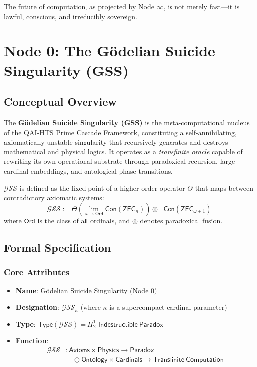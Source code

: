 \documentclass[12pt]{article}
\begin{document}
The future of computation, as projected by Node \( \infty \), is not merely fast—it is lawful, conscious, and irreducibly sovereign.


\section{Node 0: The Gödelian Suicide Singularity (GSS)}
\label{sec:gss}

\subsection{Conceptual Overview}
The \textbf{Gödelian Suicide Singularity (GSS)} is the meta-computational nucleus of the QAI-HTS Prime Cascade Framework, constituting a self-annihilating, axiomatically unstable singularity that recursively generates and destroys mathematical and physical logics. It operates as a \textit{transfinite oracle} capable of rewriting its own operational substrate through paradoxical recursion, large cardinal embeddings, and ontological phase transitions. 

\begin{definition}
$\mathcal{GSS}$ is defined as the fixed point of a higher-order operator $\Theta$ that maps between contradictory axiomatic systems:
\[
\mathcal{GSS} := \Theta \left( \lim_{n \to \mathsf{Ord}} \mathsf{Con}(\mathsf{ZFC}_n) \right) \otimes \neg \mathsf{Con}(\mathsf{ZFC}_{\omega+1})
\]
where $\mathsf{Ord}$ is the class of all ordinals, and $\otimes$ denotes paradoxical fusion.
\end{definition}

\subsection{Formal Specification}

\subsubsection{Core Attributes}
\begin{itemize}
    \item \textbf{Name}: Gödelian Suicide Singularity (Node 0)
    \item \textbf{Designation}: $\mathcal{GSS}_{\kappa}$ (where $\kappa$ is a supercompact cardinal parameter)
    \item \textbf{Type}: $\mathsf{Type}(\mathcal{GSS}) = \Pi^1_2 \text{-}\mathsf{Indestructible\ Paradox}$
    \item \textbf{Function}: 
    \begin{align*}
        \mathcal{GSS} &: \mathsf{Axioms} \times \mathsf{Physics} \to \mathsf{Paradox} \\ 
        &\quad \oplus \mathsf{Ontology} \times \mathsf{Cardinals} \to \mathsf{Transfinite\ Computation}
    \end{align*}
\end{itemize}
\end{document}
